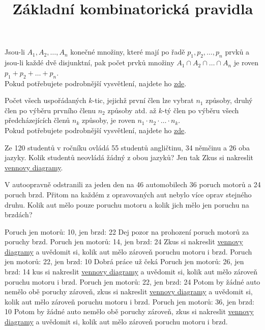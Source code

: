 \documentclass[language = czech]{webquiz}
\title{Základní kombinatorická pravidla}
\begin{document}
	\begin{discussion}\label{d1} %
		 Jsou-li $A_1,A_2,\dots,A_n$ konečné množiny, které mají po řadě $p_1,p_2,\dots,p_n$ prvků a jsou-li každé dvě disjunktní, pak počet prvků množiny $A_1 \cap A_2 \cap \dots \cap A_n$ je roven $p_1 + p_2 + \dots + p_n$.\\ Pokud potřebujete podrobnější vysvětlení, najdete ho \href{https://www.youtube.com/watch?v=kVWRTzAdc-U}{zde}.
	\end{discussion}
	
	\begin{discussion}\label{d2} %
		 Počet všech uspořádaných $k$-tic, jejichž první člen lze vybrat $n_1$ způsoby, druhý člen po výběru prvního členu $n_2$ způsoby atd. až $k$-tý člen po výběru všech předcházejících členů $n_k$ způsoby, je roven $n_1\cdot n_2 \cdot \dots \cdot n_k$.\\ Pokud potřebujete podrobnější vysvětlení, najdete ho \href{https://www.youtube.com/watch?v=JLheSkk4yWQ}{zde}.
	\end{discussion}
	
	\begin{question} \label{o1} %
		Ze 120 studentů v ročníku ovládá 55 studentů angličtinu, 34 němčinu a 26 oba jazyky. Kolik studentů neovládá žádný z obou jazyků?
		\whenRight Jen tak 
		\whenWrong Zkus si nakreslit \href{https://www.youtube.com/watch?v=5c_m2EA0sN8}{vennovy diagramy}.
	\end{question}
	
	\begin{question} \label{o2} %
		V autoopravně odstranili za jeden den na 46 automobilech 36 poruch motorů a 24 poruch brzd. Přitom na každém z opravovaných aut nebylo více oprav stejného druhu. Kolik aut mělo pouze poruchu motoru a kolik jich mělo jen poruchu na brzdách?
		\begin{choice}[columns=3]
			\incorrect Poruch jen motorů: 10, jen brzd: 22
				\feedback Dej pozor na prohození poruch motorů za poruchy brzd.
			\incorrect Poruch jen motorů: 14, jen brzd: 24
				\feedback Zkus si nakreslit \href{https://www.youtube.com/watch?v=5c_m2EA0sN8}{vennovy diagramy} a uvědomit si, kolik aut mělo zároveň poruchu motoru i brzd.
			\correct Poruch jen motorů: 22, jen brzd: 10
				\feedback Dobrá práce  už čeká
			\incorrect Poruch jen motorů: 26, jen brzd: 14
				\feedback kus si nakreslit \href{https://www.youtube.com/watch?v=5c_m2EA0sN8}{vennovy diagramy} a uvědomit si, kolik aut mělo zároveň poruchu motoru i brzd.
			\incorrect Poruch jen motorů: 22, jen brzd: 24
				\feedback Potom by žádné auto nemělo obě poruchy zároveň, zkus si nakreslit \href{https://www.youtube.com/watch?v=5c_m2EA0sN8}{vennovy diagramy} a uvědomit si, kolik aut mělo zároveň poruchu motoru i brzd. 
			\incorrect Poruch jen motorů: 36, jen brzd: 10
				\feedback Potom by žádné auto nemělo obě poruchy zároveň, zkus si nakreslit \href{https://www.youtube.com/watch?v=5c_m2EA0sN8}{vennovy diagramy} a uvědomit si, kolik aut mělo zároveň poruchu motoru i brzd. 
		\end{choice}	
	\end{question}
	
\end{document}
